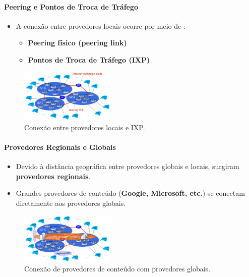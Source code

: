     \paragraph{Peering e Pontos de Troca de Tráfego}
    \begin{itemize}[left=0.5cm, align=left, nosep]
        \item A conexão entre provedores locais ocorre por meio de : 
        \begin{itemize}[left=0.5cm, nosep, label=$\hookrightarrow$]
            \item \textbf{Peering físico (peering link)} 
            \item \textbf{Pontos de Troca de Tráfego (IXP)}
        \end{itemize}     
    \end{itemize}

    \begin{figure}[H]
        \centering
        \includegraphics[width=0.4\textwidth]{img/cap-01/infraestrutura4.png}
        \caption{Conexão entre provedores locais e IXP.}
    \end{figure}

    \paragraph{Provedores Regionais e Globais}
    \begin{itemize}[left=0.5cm, align=left, nosep]
        \item Devido à distância geográfica entre provedores globais e locais, surgiram \textbf{provedores regionais}.
        \item Grandes provedores de conteúdo (\textbf{Google, Microsoft, etc.}) se conectam diretamente aos provedores globais.
    \end{itemize}

    \begin{figure}[H]
        \centering
        \includegraphics[width=0.4\textwidth]{img/cap-01/infraestrutura5.png}
        \caption{Conexão de provedores de conteúdo com provedores globais.}
    \end{figure}

